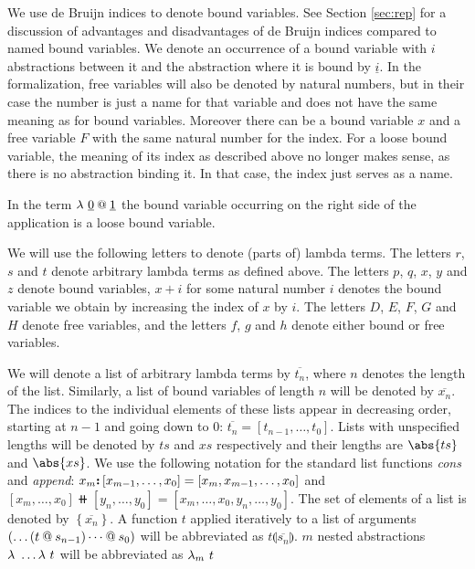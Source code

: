 We use de Bruijn indices to denote bound variables. See Section \ref{sec:rep} for a discussion of advantages and disadvantages of de Bruijn indices compared to named bound variables. We denote an occurrence of a bound variable with $i$ abstractions between it and the abstraction where it is bound by $\underline{i}$. In the formalization, free variables will also be denoted by natural numbers, but in their case the number is just a name for that variable and does not have the  same meaning as for bound variables. Moreover there can be a bound variable $x$ and a free variable $F$ with the same natural number for the index. For a loose bound variable, the meaning of its index as described above no longer makes sense, as there is no abstraction binding it. In that case, the index just serves as a name.

\begin{example}
	In the term $\lambda \ \underline{0} \mathbin{@} \underline{1}$ the bound variable occurring on the right side of the application is a loose bound variable.
\end{example}

We will use the following letters to denote (parts of) lambda terms. The letters $r$, $s$ and $t$ denote arbitrary lambda terms as defined above. The letters $p$, $q$, $x$, $y$ and $z$ denote bound variables, $x + i$ for some natural number $i$ denotes the bound variable we obtain by increasing the index of $x$ by $i$. The letters $D$, $E$, $F$, $G$ and $H$ denote free variables, and the letters $f$, $g$ and $h$ denote either bound or free variables.

We will denote a list of arbitrary lambda terms by $\overline{t_n}$, where $n$ denotes the length of the list. Similarly, a list of bound variables of length $n$ will be denoted by $\overline{x_n}$. The indices to the individual elements of these lists appear in decreasing order, starting at $n - 1$ and going down to $0$: $\overline{t_n} = [t_{n - 1}, \dots, t_0]$. Lists with unspecified lengths will be denoted by $ts$ and $xs$ respectively and their lengths are $\abs{ts}$ and $\abs{xs}$. We use the following notation for the standard list functions \textit{cons} and \textit{append}: $x_m \textbf{:} \left[x_{m - 1}, \dots, x_0 \right] = \left[x_m, x_{m - 1}, \dots, x_0 \right]$ and $\left[x_m, \dots, x_0 \right] \doubleplus \left[y_n, \dots, y_0 \right] = \left[x_m, \dots, x_0, y_n, \dots, y_0 \right]$. The set of elements of a list is denoted by $\left\{ \overline{x_n} \right\}$. A function $t$ applied iteratively to a list of arguments $\left( \dots \left( t \app s_{n - 1} \right) \dots \app s_0 \right)$ will be abbreviated as $t \llparenthesis \overline{s_n} \rrparenthesis$. $m$ nested abstractions $\lambda \ \dots \lambda \ t$ will be abbreviated as $\lambda_{m} \ t$

